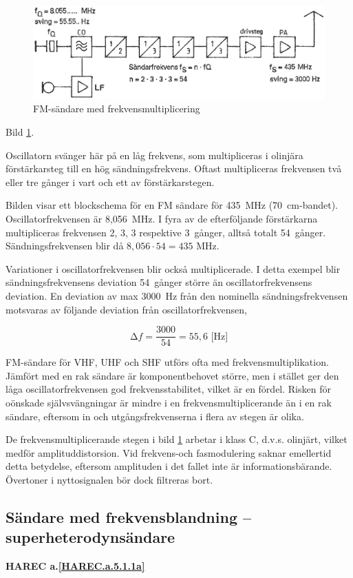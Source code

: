 \begin{figure}
  \includegraphics[width=\textwidth]{images/cropped_pdfs/bild_2_5-03.pdf}
  \caption{FM-sändare med frekvensmultiplicering}
  \label{fig:bildII5-3}
\end{figure}

Bild \ref{fig:bildII5-3}.

Oscillatorn svänger här på en låg frekvens, som multipliceras i
olinjära förstärkarsteg till en hög sändningsfrekvens. Oftast
multipliceras frekvensen två eller tre gånger i vart och ett av
förstärkarstegen.

Bilden visar ett blockschema för en FM sändare för 435~MHz (70~cm-bandet).
Oscillatorfrekvensen är 8,056~MHz.
I fyra av de efterföljande förstärkarna multipliceras frekvensen 2, 3, 3
respektive 3~gånger, alltså totalt 54~gånger. Sändningsfrekvensen blir då
\(8,056 \cdot 54 = 435\) MHz.

Variationer i oscillatorfrekvensen blir också multiplicerade. I detta
exempel blir sändningsfrekvensens deviation 54~gånger större än
oscillatorfrekvensens deviation. En deviation av max 3000~Hz från den
nominella sändningsfrekvensen motsvaras av följande deviation från
oscillatorfrekvensen,

\[∆f = \frac{3000}{54} = 55,6\text{ [Hz]}\]

FM-sändare för VHF, UHF och SHF utförs ofta med
frekvensmultiplikation. Jämfört med en rak sändare är komponentbehovet
större, men i stället ger den låga oscillatorfrekvensen god
frekvensstabilitet, vilket är en fördel. Risken för oönskade
självsvängningar är mindre i en frekvensmultiplicerande än i en rak
sändare, eftersom in och utgångsfrekvenserna i flera av stegen är
olika.

De frekvensmultiplicerande stegen i bild \ref{fig:bildII5-3} arbetar i klass C,
d.v.s. olinjärt, vilket medför amplituddistorsion. Vid frekvens-och
fasmodulering saknar emellertid detta betydelse, eftersom amplituden i
det fallet inte är informationsbärande. Övertoner i nyttosignalen bör
dock filtreras bort.

\subsection{Sändare med frekvensblandning -- superheterodynsändare}
\textbf{HAREC a.\ref{HAREC.a.5.1.1a}\label{myHAREC.a.5.1.1a}}

